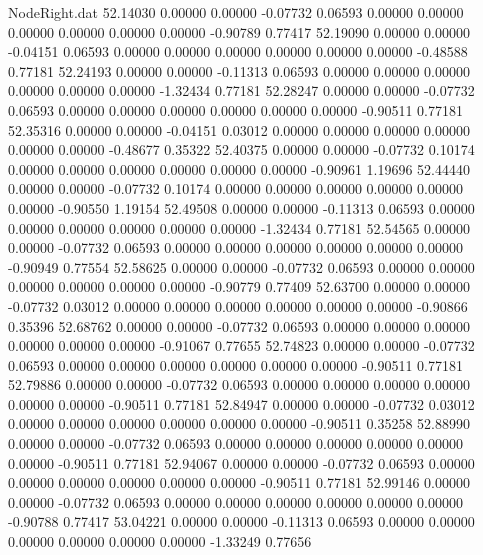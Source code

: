 \begin{filecontents}{NodeRight.dat}
  52.14030    0.00000    0.00000    -0.07732    0.06593    0.00000    0.00000    0.00000    0.00000    0.00000    0.00000   -0.90789    0.77417
  52.19090    0.00000    0.00000    -0.04151    0.06593    0.00000    0.00000    0.00000    0.00000    0.00000    0.00000   -0.48588    0.77181
  52.24193    0.00000    0.00000    -0.11313    0.06593    0.00000    0.00000    0.00000    0.00000    0.00000    0.00000   -1.32434    0.77181
  52.28247    0.00000    0.00000    -0.07732    0.06593    0.00000    0.00000    0.00000    0.00000    0.00000    0.00000   -0.90511    0.77181
  52.35316    0.00000    0.00000    -0.04151    0.03012    0.00000    0.00000    0.00000    0.00000    0.00000    0.00000   -0.48677    0.35322
  52.40375    0.00000    0.00000    -0.07732    0.10174    0.00000    0.00000    0.00000    0.00000    0.00000    0.00000   -0.90961    1.19696
  52.44440    0.00000    0.00000    -0.07732    0.10174    0.00000    0.00000    0.00000    0.00000    0.00000    0.00000   -0.90550    1.19154
  52.49508    0.00000    0.00000    -0.11313    0.06593    0.00000    0.00000    0.00000    0.00000    0.00000    0.00000   -1.32434    0.77181
  52.54565    0.00000    0.00000    -0.07732    0.06593    0.00000    0.00000    0.00000    0.00000    0.00000    0.00000   -0.90949    0.77554
  52.58625    0.00000    0.00000    -0.07732    0.06593    0.00000    0.00000    0.00000    0.00000    0.00000    0.00000   -0.90779    0.77409
  52.63700    0.00000    0.00000    -0.07732    0.03012    0.00000    0.00000    0.00000    0.00000    0.00000    0.00000   -0.90866    0.35396
  52.68762    0.00000    0.00000    -0.07732    0.06593    0.00000    0.00000    0.00000    0.00000    0.00000    0.00000   -0.91067    0.77655
  52.74823    0.00000    0.00000    -0.07732    0.06593    0.00000    0.00000    0.00000    0.00000    0.00000    0.00000   -0.90511    0.77181
  52.79886    0.00000    0.00000    -0.07732    0.06593    0.00000    0.00000    0.00000    0.00000    0.00000    0.00000   -0.90511    0.77181
  52.84947    0.00000    0.00000    -0.07732    0.03012    0.00000    0.00000    0.00000    0.00000    0.00000    0.00000   -0.90511    0.35258
  52.88990    0.00000    0.00000    -0.07732    0.06593    0.00000    0.00000    0.00000    0.00000    0.00000    0.00000   -0.90511    0.77181
  52.94067    0.00000    0.00000    -0.07732    0.06593    0.00000    0.00000    0.00000    0.00000    0.00000    0.00000   -0.90511    0.77181
  52.99146    0.00000    0.00000    -0.07732    0.06593    0.00000    0.00000    0.00000    0.00000    0.00000    0.00000   -0.90788    0.77417
  53.04221    0.00000    0.00000    -0.11313    0.06593    0.00000    0.00000    0.00000    0.00000    0.00000    0.00000   -1.33249    0.77656

\end{filecontents}
